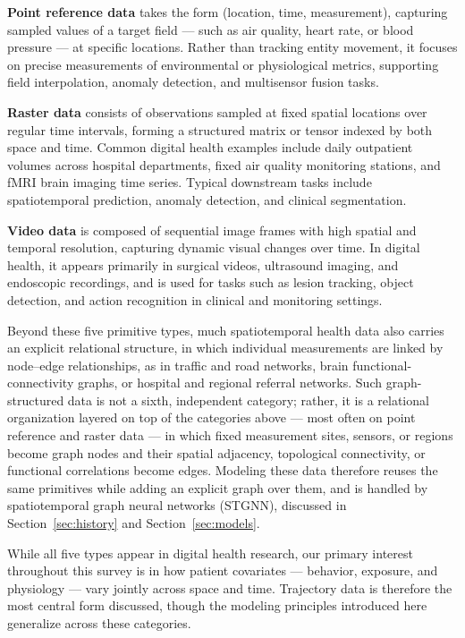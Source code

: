 \documentclass[acmsmall]{acmart}
\begin{document}
\textbf{Point reference data} takes the form (location, time, measurement), capturing sampled 
values of a target field --- such as air quality, heart rate, or blood pressure --- at specific 
locations. Rather than tracking entity movement, it focuses on precise measurements of 
environmental or physiological metrics, supporting field interpolation, anomaly detection, and 
multisensor fusion tasks.

\textbf{Raster data} consists of observations sampled at fixed spatial locations over regular 
time intervals, forming a structured matrix or tensor indexed by both space and time. Common 
digital health examples include daily outpatient volumes across hospital departments, fixed air 
quality monitoring stations, and fMRI brain imaging time series. Typical downstream tasks include 
spatiotemporal prediction, anomaly detection, and clinical segmentation.

\textbf{Video data} is composed of sequential image frames with high spatial and temporal 
resolution, capturing dynamic visual changes over time. In digital health, it appears primarily 
in surgical videos, ultrasound imaging, and endoscopic recordings, and is used for tasks such as 
lesion tracking, object detection, and action recognition in clinical and monitoring settings.

Beyond these five primitive types, much spatiotemporal health data also carries an explicit relational structure, in which individual measurements are linked by node--edge relationships, as in traffic and road networks, brain functional-connectivity graphs, or hospital and regional referral networks. Such graph-structured data is not a sixth, independent category; rather, it is a relational organization layered on top of the categories above --- most often on point reference and raster data --- in which fixed measurement sites, sensors, or regions become graph nodes and their spatial adjacency, topological connectivity, or functional correlations become edges. Modeling these data therefore reuses the same primitives while adding an explicit graph over them, and is handled by spatiotemporal graph neural networks (STGNN), discussed in Section~\ref{sec:history} and Section~\ref{sec:models}.

While all five types appear in digital health research, our primary interest throughout this
survey is in how patient covariates --- behavior, exposure, and physiology --- vary jointly 
across space and time. Trajectory data is therefore the most central form discussed, though the 
modeling principles introduced here generalize across these categories.
\end{document}
